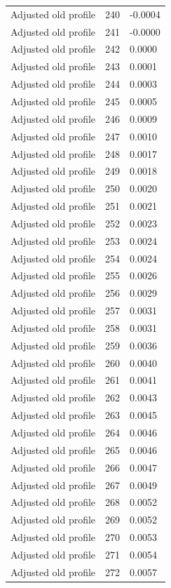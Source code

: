 \begin{table}[htbp]
\begin{tabular}{lll}
Adjusted old profile & 240 & -0.0004 \\
Adjusted old profile & 241 & -0.0000 \\
Adjusted old profile & 242 & 0.0000 \\
Adjusted old profile & 243 & 0.0001 \\
Adjusted old profile & 244 & 0.0003 \\
Adjusted old profile & 245 & 0.0005 \\
Adjusted old profile & 246 & 0.0009 \\
Adjusted old profile & 247 & 0.0010 \\
Adjusted old profile & 248 & 0.0017 \\
Adjusted old profile & 249 & 0.0018 \\
Adjusted old profile & 250 & 0.0020 \\
Adjusted old profile & 251 & 0.0021 \\
Adjusted old profile & 252 & 0.0023 \\
Adjusted old profile & 253 & 0.0024 \\
Adjusted old profile & 254 & 0.0024 \\
Adjusted old profile & 255 & 0.0026 \\
Adjusted old profile & 256 & 0.0029 \\
Adjusted old profile & 257 & 0.0031 \\
Adjusted old profile & 258 & 0.0031 \\
Adjusted old profile & 259 & 0.0036 \\
Adjusted old profile & 260 & 0.0040 \\
Adjusted old profile & 261 & 0.0041 \\
Adjusted old profile & 262 & 0.0043 \\
Adjusted old profile & 263 & 0.0045 \\
Adjusted old profile & 264 & 0.0046 \\
Adjusted old profile & 265 & 0.0046 \\
Adjusted old profile & 266 & 0.0047 \\
Adjusted old profile & 267 & 0.0049 \\
Adjusted old profile & 268 & 0.0052 \\
Adjusted old profile & 269 & 0.0052 \\
Adjusted old profile & 270 & 0.0053 \\
Adjusted old profile & 271 & 0.0054 \\
Adjusted old profile & 272 & 0.0057 \\

\end{tabular}
\end{table}
